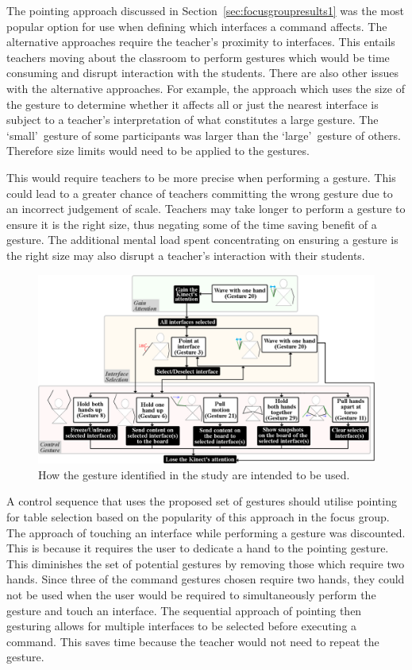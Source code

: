 \documentclass[manuscript, review, screen]{acmart}
\begin{document}
The pointing approach discussed in Section~\ref{sec:focusgroupresults1} was the most popular option for use when defining which interfaces a command affects.
The alternative approaches require the teacher's proximity to interfaces.
This entails teachers moving about the classroom to perform gestures which would be time consuming and disrupt interaction with the students.
There are also other issues with the alternative approaches.
For example, the approach which uses the size of the gesture to determine whether it affects all or just the nearest interface is subject to a teacher's interpretation of what constitutes a large gesture.
The \lq small\rq\ gesture of some participants was larger than the \lq large\rq\ gesture of others.
Therefore size limits would need to be applied to the gestures.

This would require teachers to be more precise when performing a gesture.
This could lead to a greater chance of teachers committing the wrong gesture due to an incorrect judgement of scale.
Teachers may take longer to perform a gesture to ensure it is the right size, thus negating some of the time saving benefit of a gesture.
The additional mental load spent concentrating on ensuring a gesture is the right size may also disrupt a teacher's interaction with their students.

\begin{figure}[t]
   \centering
   \includegraphics[width=1\textwidth]{figures/control_flow.png}
   \caption{How the gesture identified in the study are intended to be used.}
   \label{fig:flow}
\end{figure}

A control sequence that uses the proposed set of gestures should utilise pointing for table selection based on the popularity of this approach in the focus group.
The approach of touching an interface while performing a gesture was discounted.  
This is because it requires the user to dedicate a hand to the pointing gesture.  
This diminishes the set of potential gestures by removing those which require two hands.
Since three of the command gestures chosen require two hands, they could not be used when the user would be required to simultaneously perform the gesture and touch an interface.
The sequential approach of pointing then gesturing allows for multiple interfaces to be selected before executing a command.
This saves time because the teacher would not need to repeat the gesture.
\end{document}
